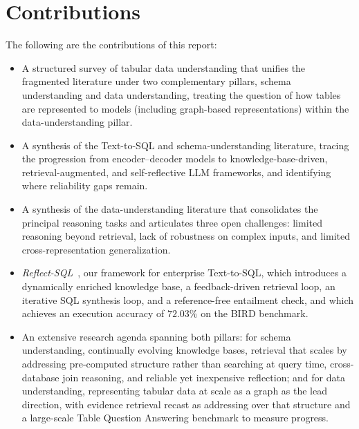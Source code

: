 \section{Contributions}
The following are the contributions of this report:
\begin{itemize}
    \item A structured survey of tabular data understanding that unifies the fragmented literature under two complementary pillars, schema understanding and data understanding, treating the question of how tables are represented to models (including graph-based representations) within the data-understanding pillar.

    \item A synthesis of the Text-to-SQL and schema-understanding literature, tracing the progression from encoder--decoder models to knowledge-base-driven, retrieval-augmented, and self-reflective LLM frameworks, and identifying where reliability gaps remain.

    \item A synthesis of the data-understanding literature that consolidates the principal reasoning tasks and articulates three open challenges: limited reasoning beyond retrieval, lack of robustness on complex inputs, and limited cross-representation generalization.

    \item \emph{Reflect-SQL}~\cite{jain2027reflectsql}, our framework for enterprise Text-to-SQL, which introduces a dynamically enriched knowledge base, a feedback-driven retrieval loop, an iterative SQL synthesis loop, and a reference-free entailment check, and which achieves an execution accuracy of $72.03\%$ on the BIRD benchmark.

    \item An extensive research agenda spanning both pillars: for schema understanding, continually evolving knowledge bases, retrieval that scales by addressing pre-computed structure rather than searching at query time, cross-database join reasoning, and reliable yet inexpensive reflection; and for data understanding, representing tabular data at scale as a graph as the lead direction, with evidence retrieval recast as addressing over that structure and a large-scale Table Question Answering benchmark to measure progress.
\end{itemize}

